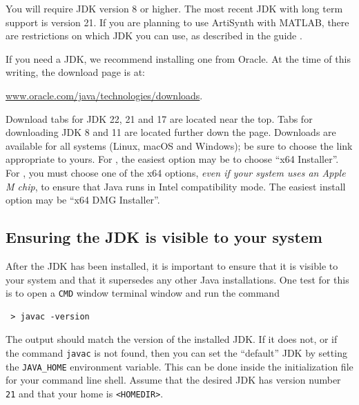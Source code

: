 You will require JDK version 8 or higher. The most recent JDK with long term
support is version 21. If you are planning to use
ArtiSynth with MATLAB, there are restrictions on which JDK you can use, as
described in the guide
.

If you need a JDK, we recommend installing one from Oracle.  At the time of
this writing, the download page is at:

\href{https://www.oracle.com/java/technologies/downloads/}%
{www.oracle.com/java/technologies/downloads}.

Download tabs for JDK 22, 21 and 17 are located near the top.  Tabs for
downloading JDK 8 and 11 are located further down the page.
Downloads are available for all systems ({\sf Linux}, {\sf macOS} and
{\sf Windows}); be sure to choose the link appropriate to yours.
\ifWindows
For \SYSTEM{}, the easiest option may be to choose ``{\sf x64 Installer}''.
\fi
\ifMacOS
For \SYSTEM{}, you must choose one of the {\sf x64} options,
{\it even if your system uses an Apple M chip}, to ensure
that Java runs in Intel compatibility mode. The
easiest install option may be ``{\sf x64 DMG Installer}''.
\fi

\subsection{Ensuring the JDK is visible to your system}
\label{MakingJDKVisible}

After the JDK has been installed, it is important to ensure that it is
visible to your system and that it supersedes any other Java
installations. One test for this is to open a
\ifWindows
{\tt CMD} window
\else
terminal window
\fi
and run the command 
\begin{verbatim}
 > javac -version
\end{verbatim}
The output should match the version of the installed JDK. If it does
not, or if the command {\tt javac} is not found,
\ifMacOS %
then you can set the ``default'' JDK by setting the {\tt JAVA\_HOME}
environment variable.  This can be done inside the
initialization file for your command line shell.
Assume that the desired JDK has version number {\tt 21} and
that your home \directory{} is {\tt <HOMEDIR>}. 

